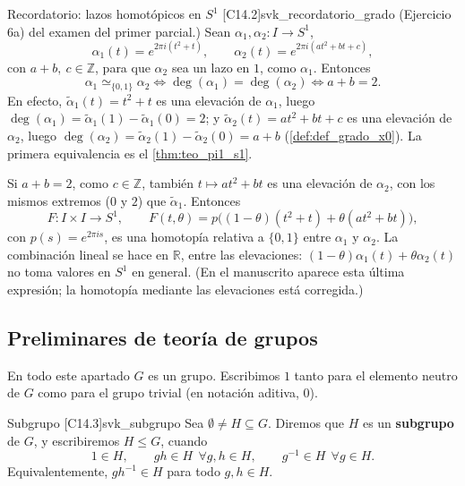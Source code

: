 \begin{observacion}{Recordatorio: lazos homotópicos en $S^1$ [C14.2]}{svk_recordatorio_grado}
(Ejercicio 6a) del examen del primer parcial.)
Sean $\alpha_1, \alpha_2 \colon I \to S^1$,
\[ \alpha_1(t) = e^{2\pi i (t^2 + t)}, \qquad \alpha_2(t) = e^{2\pi i (a t^2 + b t + c)}, \]
con $a + b,\ c \in \mathbb{Z}$, para que $\alpha_2$ sea un lazo en $1$, como $\alpha_1$. Entonces
\[ \alpha_1 \simeq_{\{0,1\}} \alpha_2 \iff \deg(\alpha_1) = \deg(\alpha_2) \iff a + b = 2. \]
En efecto, $\tilde\alpha_1(t) = t^2 + t$ es una elevación de $\alpha_1$, luego $\deg(\alpha_1) = \tilde\alpha_1(1) - \tilde\alpha_1(0) = 2$; y $\tilde\alpha_2(t) = a t^2 + b t + c$ es una elevación de $\alpha_2$, luego $\deg(\alpha_2) = \tilde\alpha_2(1) - \tilde\alpha_2(0) = a + b$ (\cref{def:def_grado_x0}). La primera equivalencia es el \cref{thm:teo_pi1_s1}.

Si $a + b = 2$, como $c \in \mathbb{Z}$, también $t \mapsto at^2 + bt$ es una elevación de $\alpha_2$, con los mismos extremos ($0$ y $2$) que $\tilde\alpha_1$. Entonces
\[ F \colon I \times I \to S^1, \qquad F(t,\theta) = p\big((1-\theta)(t^2+t) + \theta(at^2+bt)\big), \]
con $p(s) = e^{2\pi i s}$, es una homotopía relativa a $\{0,1\}$ entre $\alpha_1$ y $\alpha_2$. La combinación lineal se hace en $\mathbb{R}$, entre las elevaciones: $(1-\theta)\alpha_1(t) + \theta\alpha_2(t)$ no toma valores en $S^1$ en general. (En el manuscrito aparece esta última expresión; la homotopía mediante las elevaciones está corregida.)
\end{observacion}

\subsection{Preliminares de teoría de grupos}

En todo este apartado $G$ es un grupo. Escribimos $1$ tanto para el elemento neutro de $G$ como para el grupo trivial (en notación aditiva, $0$).

\begin{definicion}{Subgrupo [C14.3]}{svk_subgrupo}
Sea $\emptyset \neq H \subseteq G$. Diremos que $H$ es un \textbf{subgrupo} de $G$, y escribiremos $H \leq G$, cuando
\[ 1 \in H, \qquad gh \in H \ \ \forall g, h \in H, \qquad g^{-1} \in H \ \ \forall g \in H. \]
Equivalentemente, $gh^{-1} \in H$ para todo $g, h \in H$.
\end{definicion}

